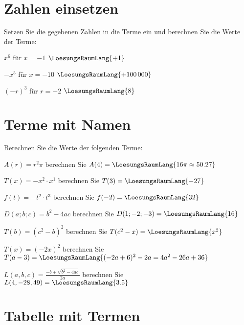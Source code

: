 \platzFuerBerechnungenBisEndeSeite{}

\TRAINER{\newpage}
\section{Zahlen einsetzen}
Setzen Sie die gegebenen Zahlen in die Terme ein und berechnen Sie die
Werte der Terme:

\begin{bbwAufgabenBlock}
\item $x^6$ für $x=-1$ $\LoesungsRaumLang{+1}$
\item $-x^5$ für $x=-10$ $\LoesungsRaumLang{+100\,000}$
\item $(-r)^3$ für $r=-2$ $\LoesungsRaumLang{8}$
\end{bbwAufgabenBlock}
\platzFuerBerechnungenBisEndeSeite{}

\section{Terme mit Namen}
Berechnen Sie die Werte der folgenden Terme:

\begin{bbwAufgabenBlock}
\item $A(r)=r^2\pi$ berechnen Sie $A(4)= \LoesungsRaumLang{16\pi\approx{}50.27}$
\item $T(x)=-x^2\cdot{}x^1$ berechnen Sie $T(3)= \LoesungsRaumLang{-27}$
\item $f(t)=-t^2\cdot{}t^3$ berechnen Sie $f(-2)= \LoesungsRaumLang{32}$
\item $D(a;b;c)=b^2-4ac$ berechnen Sie $D(1;-2;-3)= \LoesungsRaumLang{16}$
\item $T(b)=(c^2-b)^2$ berechnen Sie $T(c^2-x)= \LoesungsRaumLang{x^2}$
\item $T(x)=(-2x)^2$ berechnen Sie $T(a-3)= \LoesungsRaumLang{(-2a+6)^2-2a=4a^2-26a+36}$
\item $L(a,b,c)=\frac{-b+\sqrt{b^2-4ac}}{2a}$ berechnen Sie $L(4, -28,
49)= \LoesungsRaumLang{3.5}$
\end{bbwAufgabenBlock}
\platzFuerBerechnungenBisEndeSeite{}

\section{Tabelle mit Termen}
\nextBbwAufgabenNummer{}

